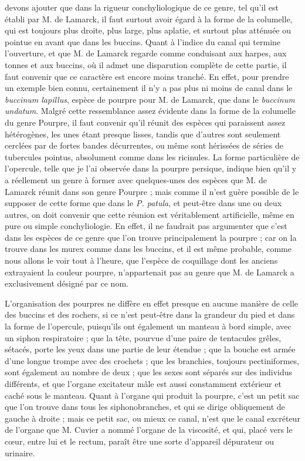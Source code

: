 \documentclass[a4paper, 11pt, oneside, polutonikogreek, french]{article}
\begin{document}
devons ajouter que dans la rigueur conchyliologique de ce genre, tel qu'il est établi par M. de Lamarck, il faut surtout avoir égard à la forme de la columelle, qui est toujours plus droite, plus large, plus aplatie, et surtout plus atténuée ou pointue en avant que dans les buccins. Quant à l'indice du canal qui termine l'ouverture, et que M. de Lamarck regarde comme conduisant aux harpes, aux tonnes et aux buccins, où il admet une disparution complète de cette partie, il faut convenir que ce caractère est encore moins tranché. En effet, pour prendre un exemple bien connu, certainement il n'y a pas plus ni moins de canal dans le \emph{buccinum lapillus}, espèce de pourpre pour M. de Lamarck, que dans le \emph{buccinum undatum}. Malgré cette ressemblance assez évidente dans la forme de la columelle du genre Pourpre, il faut convenir qu'il réunit des espèces qui paraissent assez hétérogènes, les unes étant presque lisses, tandis que d'autres sont seulement cerclées par de fortes bandes décurrentes, ou même sont hérissées de séries de tubercules pointus, absolument comme dans les ricinules. La forme particulière de l'opercule, telle que je l'ai observée dans la pourpre persique, indique bien qu'il y a réellement un genre à former avec quelques-unes des espèces que M. de Lamarck réunit dans son genre Pourpre ; mais comme il n'est guère possible de le supposer de cette forme que dans le \emph{P. patula}, et peut-être dans une ou deux autres, on doit convenir que cette réunion est véritablement artificielle, même en pure ou simple conchyliologie. En effet, il ne faudrait pas argumenter que c'est dans les espèces de ce genre que l'on trouve principalement la pourpre ; car on la trouve dans les murex comme dans les buccins, et il est même probable, comme nous allons le voir tout à l'heure, que l'espèce de coquillage dont les anciens extrayaient la couleur pourpre, n'appartenait pas au genre que M. de Lamarck a exclusivement désigné par ce nom.

L'organisation des pourpres ne diffère en effet presque en aucune manière de celle des buccins et des rochers, si ce n'est peut-être dans la grandeur du pied et dans la forme de l'opercule, puisqu'ils ont également un manteau à bord simple, avec un siphon respiratoire ; que la tête, pourvue d'une paire de tentacules grêles, sétacés, porte les yeux dans une partie de leur étendue ; que la bouche est armée d'une longue trompe avec des crochets ; que les branchies, toujours pectiniformes, sont également au nombre de deux ; que les sexes sont séparés sur des individus différents, et que l'organe excitateur mâle est aussi constamment extérieur et caché sous le manteau. Quant à l'organe qui produit la pourpre, c'est un petit sac que l'on trouve dans tous les siphonobranches, et qui se dirige obliquement de gauche à droite ; mais ce petit sac, ou mieux ce canal, n'est que le canal excréteur de l'organe que M. Cuvier a nommé l'organe de la viscosité, et qui, placé vers le cœur, entre lui et le rectum, paraît être une sorte d'appareil dépurateur ou urinaire.
\end{document}
